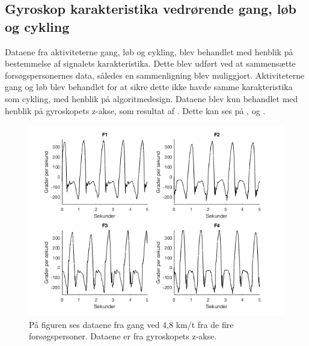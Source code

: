 \subsection{Gyroskop karakteristika vedrørende gang, løb og cykling}
Dataene fra aktiviteterne gang, løb og cykling, blev behandlet med henblik på bestemmelse af signalets karakteristika. Dette blev udført ved at sammensætte forsøgspersonernes data, således en sammenligning blev muliggjort. Aktiviteterne gang og løb blev behandlet for at sikre dette ikke havde samme karakteristika som cykling, med henblik på algoritmedesign. Dataene blev kun behandlet med henblik på gyroskopets z-akse, som resultat af . Dette kan ses på ,  og .
\begin{figure}[H]
	\centering
	\includegraphics[scale=0.5]{figures/qBilag/gang_gyro}
	\caption{På figuren ses dataene fra gang ved 4,8 km/t fra de fire forsøgspersoner. Dataene er fra gyroskopets z-akse.}
	\label{fig:Ap_cykling1}
\end{figure}\vspace{-.25cm}


